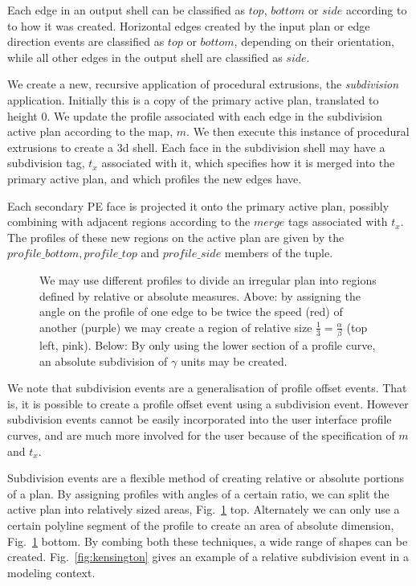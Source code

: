 Each edge in an output shell can be classified as $top$, $bottom$ or $side$ according to to how it was created. Horizontal edges created by the input plan or edge direction events are classified as $top$ or $bottom$, depending on their orientation, while all other edges in the output shell are classified as $side$.

We create a new, recursive application of procedural extrusions, the \emph{subdivision} application. Initially this is a copy of the primary active plan, translated to height 0. We update the profile associated with each edge in the subdivision active plan according to the map, $m$. We then execute this instance of procedural extrusions to create a 3d shell. Each face in the subdivision shell may have a subdivision tag, $t_x$ associated with it, which specifies how it is merged into the primary active plan, and which profiles the new edges have.

Each secondary PE face is projected it onto the primary active plan, possibly combining with adjacent regions according to the $merge$ tags associated with $t_x$. The profiles of these new regions on the active plan are given by the $profile\_bottom, profile\_top$ and  $profile\_side$ members of the tuple.

\begin{figure}
  \centering
  \def\svgwidth{0.8\columnwidth}
  
  \caption[The subdivision event for creating relative and absolute partitions]{\label{fig:skel_subdiv_rel_abs} We may use different profiles to divide an irregular plan into regions defined by relative or absolute measures. Above: by assigning the angle on the profile of one edge to be twice the speed (red) of another (purple) we may create a region of relative size $\frac{1}{3} = \frac{\alpha}{\beta}$ (top left, pink). Below: By only using the lower section of a profile curve, an absolute subdivision of $\gamma$ units may be created.}
\end{figure}

We note that subdivision events are a generalisation of profile offset events. That is, it is possible to create a profile offset event using a subdivision event. However subdivision events cannot be easily incorporated into the user interface profile curves, and are much more involved for the user because of the specification of $m$ and $t_x$.

Subdivision events are a flexible method of creating relative or absolute portions of a plan. By assigning profiles with angles of a certain ratio, we can split the active plan into relatively sized areas, Fig.~\ref{fig:skel_subdiv_rel_abs} top. Alternately we can only use a certain polyline segment of the profile to create an area of absolute dimension, Fig.~\ref{fig:skel_subdiv_rel_abs} bottom. By combing both these techniques, a wide range of shapes can be created. Fig.~\ref{fig:kensington} gives an example of a relative subdivision event in a modeling context.

